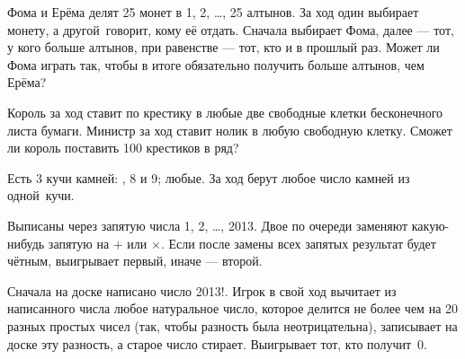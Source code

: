 \documentclass[a4paper,11pt]{article}
\begin{document}
Фома и Ерёма делят 25 монет в 1, 2, \dots, 25
алтынов.  За ход один выбирает монету, а другой~говорит,
кому её отдать. Сначала выбирает Фома, далее --- тот, у кого
больше алтынов, при равенстве --- тот, кто и в прошлый раз.  Может ли
Фома играть так, чтобы в итоге обязательно получить больше алтынов,
чем Ерёма?


\vspace*{-1truemm}






Король за ход ставит по крестику в любые две свободные клетки
бесконечного листа бумаги. Министр за ход ставит нолик в любую
свободную клетку. Сможет ли король поставить 100 крестиков в ряд?


 Есть 3 кучи камней:\!\!\!
, 8 и 9;\!\!\!
 \!\!\! любые.
За ход берут любое число камней из одной~кучи.

Выписаны через запятую числа 1, 2, \dots, 2013.
Двое по очереди заменяют какую-нибудь запятую на $+$ или $\times$.
Если после замены всех запятых результат будет чётным,
выигрывает первый, иначе --- второй.

Сначала на доске написано число 2013!.
Игрок в свой ход вычитает
из написанного  числа любое натуральное число,  которое
делится не более  чем  на 20 разных простых чисел (так,  чтобы
разность была неотрицательна), записывает  на  доске эту разность,
а старое число стирает. Выигрывает тот, кто получит~0.

\vspace*{-2mm}
\vspace*{-3mm}

\end{document}
